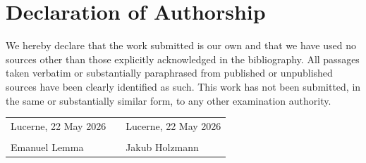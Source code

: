 \section*{Declaration of Authorship}
\label{sec:declaration}

We hereby declare that the work submitted is our own and that we have used no
sources other than those explicitly acknowledged in the bibliography. All
passages taken verbatim or substantially paraphrased from published or
unpublished sources have been clearly identified as such. This work has not
been submitted, in the same or substantially similar form, to any other
examination authority.

\vspace{3cm}

\noindent
\begin{tabular}{p{6.5cm} p{1.5cm} p{6.5cm}}
  Lucerne, 22 May 2026 & & Lucerne, 22 May 2026 \\[2.5cm]
  \hrulefill & & \hrulefill \\[2pt]
  Emanuel Lemma & & Jakub Holzmann \\
\end{tabular}
